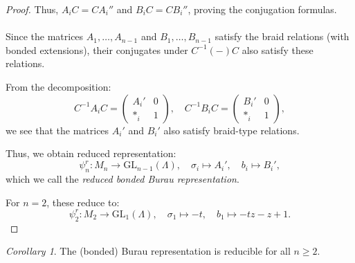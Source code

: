 \documentclass{article}
\theoremstyle{definition}
\theoremstyle{plain}
\theoremstyle{remark}
\newtheorem{corollary}{Corollary}
\begin{document}
\begin{proof}
Thus, $A_i C = C A_i''$ and $B_i C = C B_i''$, proving the conjugation formulas.\\
\\
Since the matrices $A_1, \dots, A_{n-1}$ and $B_1, \dots, B_{n-1}$ satisfy the braid relations (with bonded extensions), their conjugates under $C^{-1} (-) C$ also satisfy these relations.

From the decomposition:
$$
C^{-1} A_i C = \begin{pmatrix} A_i' & 0 \\ \ast_i & 1 \end{pmatrix}, \quad
C^{-1} B_i C = \begin{pmatrix} B_i' & 0 \\ \ast_i & 1 \end{pmatrix},
$$
we see that the matrices $A_i'$ and $B_i'$ also satisfy braid-type relations.

Thus, we obtain reduced representation:
$$
\psi_n^r: M_n \longrightarrow \mathrm{GL}_{n-1}(\Lambda), \quad \sigma_i \mapsto A_i', \quad b_i \mapsto B_i',
$$
which we call the \emph{reduced bonded Burau representation}.

For $n = 2$, these reduce to:
$$
\psi_2^r : M_2 \longrightarrow \mathrm{GL}_1(\Lambda), \quad \sigma_1 \mapsto -t, \quad b_1 \mapsto -tz - z + 1.
$$


\end{proof}

\begin{corollary}
The (bonded) Burau representation is reducible for all $n \geq 2$.
\end{corollary}
\end{document}
